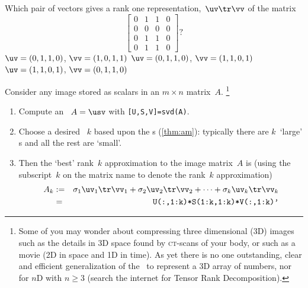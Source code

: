 \begin{example}
\begin{solution}
\begin{enumerate}
\end{enumerate}
\end{solution}
\end{example}




\begin{activity}
Which pair of vectors gives a rank one representation,~\(\uv\tr\vv\) of the matrix
\marginpar{}%
\begin{equation*}
\begin{bmatrix} 0&1&1&0 
\\0&0&0&0
\\0&1&1&0
\\0&1&1&0 \end{bmatrix}?
\end{equation*}
{\(\uv=(0,1,1,0)\), \(\vv=(1,0,1,1)\)}
{\(\uv=(0,1,1,0)\), \(\vv=(1,1,0,1)\)}
{\(\uv=(1,1,0,1)\), \(\vv=(0,1,1,0)\)}
\end{activity}





\begin{procedure} \label{pro:ai} 
Consider any image stored as scalars in an \(m\times n\) matrix~\(A\).%
\footnote{Some of you may wonder about compressing three dimensional (3D) images such as the details in 3D space found by \textsc{ct}-scans of your body, or such as a movie (2D in space  and 1D in time). 
As yet there is no one outstanding, clear and efficient generalization of the \svd\ to represent a 3D array of numbers, nor for \(n\)D with \(n\geq3\) (search the internet for Tensor Rank Decomposition).}
\begin{enumerate}
\item Compute an \svd\ \(A=\usv\) with \verb|[U,S,V]=svd(A)|.
\item Choose a desired ~\(k\) based upon the s (\cref{thm:am}): typically there are \(k\)~`large' s and all the rest are `small'.
\item Then the `best' rank~\(k\) approximation to the image matrix~\(A\) is (using the subscript~\(k\) on the matrix name to denote the rank~\(k\) approximation)
\begin{eqnarray*}
A_k&:=&\sigma_1\uv_1\tr\vv_1+\sigma_2\uv_2\tr\vv_2+\cdots+\sigma_k\uv_k\tr\vv_k
\\&=&\verb|U(:,1:k)*S(1:k,1:k)*V(:,1:k)'|
\end{eqnarray*}
\end{enumerate}
\end{procedure}






